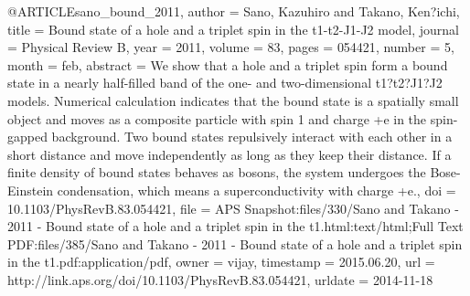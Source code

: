 @ARTICLE{sano_bound_2011,
  author = {Sano, Kazuhiro and Takano, Ken?ichi},
  title = {Bound state of a hole and a triplet spin in the t1-t2-{J}1-{J}2 model},
  journal = {Physical Review B},
  year = {2011},
  volume = {83},
  pages = {054421},
  number = {5},
  month = feb,
  abstract = {We show that a hole and a triplet spin form a bound state in a nearly
	half-filled band of the one- and two-dimensional t1?t2?J1?J2 models.
	Numerical calculation indicates that the bound state is a spatially
	small object and moves as a composite particle with spin 1 and charge
	+e in the spin-gapped background. Two bound states repulsively interact
	with each other in a short distance and move independently as long
	as they keep their distance. If a finite density of bound states
	behaves as bosons, the system undergoes the Bose-Einstein condensation,
	which means a superconductivity with charge +e.},
  doi = {10.1103/PhysRevB.83.054421},
  file = {APS Snapshot:files/330/Sano and Takano - 2011 - Bound state of a hole and a triplet spin in the t1.html:text/html;Full Text PDF:files/385/Sano and Takano - 2011 - Bound state of a hole and a triplet spin in the t1.pdf:application/pdf},
  owner = {vijay},
  timestamp = {2015.06.20},
  url = {http://link.aps.org/doi/10.1103/PhysRevB.83.054421},
  urldate = {2014-11-18}
}


